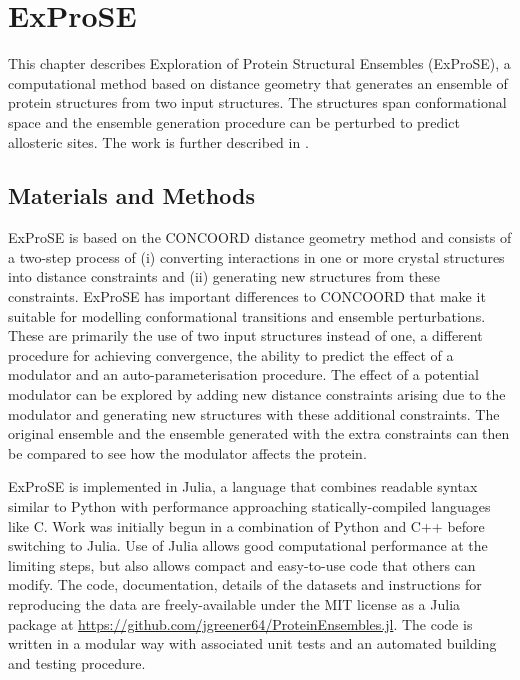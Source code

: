 \chapter{ExProSE}
\label{cha:exprose}

This chapter describes Exploration of Protein Structural Ensembles (ExProSE), a computational method based on distance geometry that generates an ensemble of protein structures from two input structures.
The structures span conformational space and the ensemble generation procedure can be perturbed to predict allosteric sites.
The work is further described in \cite{Greener2017}.


\section{Materials and Methods}
\label{sec:exprose_methods}

ExProSE is based on the CONCOORD distance geometry method \cite{DeGroot1997} and consists of a two-step process of (i) converting interactions in one or more crystal structures into distance constraints and (ii) generating new structures from these constraints.
ExProSE has important differences to CONCOORD that make it suitable for modelling conformational transitions and ensemble perturbations.
These are primarily the use of two input structures instead of one, a different procedure for achieving convergence, the ability to predict the effect of a modulator and an auto-parameterisation procedure.
The effect of a potential modulator can be explored by adding new distance constraints arising due to the modulator and generating new structures with these additional constraints. The original ensemble and the ensemble generated with the extra constraints can then be compared to see how the modulator affects the protein.

ExProSE is implemented in Julia, a language that combines readable syntax similar to Python with performance approaching statically-compiled languages like C.
Work was initially begun in a combination of Python and C++ before switching to Julia.
Use of Julia allows good computational performance at the limiting steps, but also allows compact and easy-to-use code that others can modify.
The code, documentation, details of the datasets and instructions for reproducing the data are freely-available under the MIT license as a Julia package at \url{https://github.com/jgreener64/ProteinEnsembles.jl}.
The code is written in a modular way with associated unit tests and an automated building and testing procedure.


